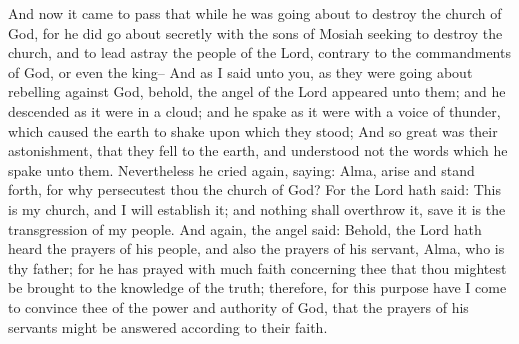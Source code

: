 And now it came to pass that while he was going about to destroy the church of God, for he did go about secretly with the sons of Mosiah seeking to destroy the church, and to lead astray the people of the Lord, contrary to the commandments of God, or even the king--
\bverse \iffalse And as I said unto you, as they were going about rebelling against God, behold, the angel of the Lord appeared unto them; and he descended as it were in a cloud; and he spake as it were with a voice of thunder, which caused the earth to shake upon which they stood; \fi
And as I said unto you, as they were going about rebelling against God, behold, the angel of the Lord appeared unto them; and he descended as it were in a cloud; and he spake as it were with a voice of thunder, which caused the earth to shake upon which they stood;
\bverse \iffalse And so great was their astonishment, that they fell to the earth, and understood not the words which he spake unto them. \fi
And so great was their astonishment, that they fell to the earth, and understood not the words which he spake unto them.
\bverse \iffalse Nevertheless he cried again, saying: Alma, arise and stand forth, for why persecutest thou the church of God? For the Lord hath said: This is my church, and I will establish it; and nothing shall overthrow it, save it is the transgression of my people. \fi
Nevertheless he cried again, saying: Alma, arise and stand forth, for why persecutest thou the church of God? For the Lord hath said: This is my church, and I will establish it; and nothing shall overthrow it, save it is the transgression of my people.
\bverse \iffalse And again, the angel said: Behold, the Lord hath heard the prayers of his people, and also the prayers of his servant, Alma, who is thy father; for he has prayed with much faith concerning thee that thou mightest be brought to the knowledge of the truth; therefore, for this purpose have I come to convince thee of the power and authority of God, that the prayers of his servants might be answered according to their faith. \fi
And again, the angel said: Behold, the Lord hath heard the prayers of his people, and also the prayers of his servant, Alma, who is thy father; for he has prayed with much faith concerning thee that thou mightest be brought to the knowledge of the truth; therefore, for this purpose have I come to convince thee of the power and authority of God, that the prayers of his servants might be answered according to their faith.
\bverse \iffalse And now behold, can ye dispute the power of God? For behold, doth not my voice shake the earth? And can ye not also behold me before you? And I am sent from God. \fi
